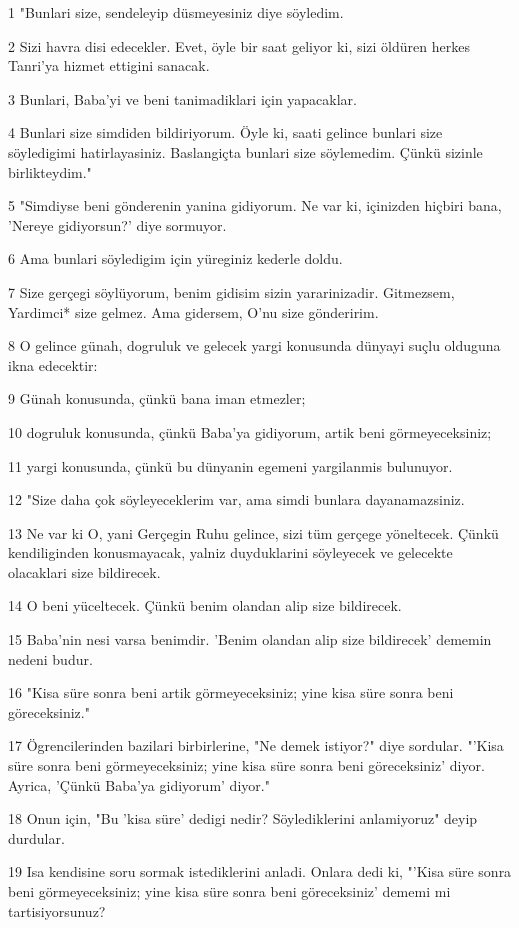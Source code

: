 \par 1 "Bunlari size, sendeleyip düsmeyesiniz diye söyledim.
\par 2 Sizi havra disi edecekler. Evet, öyle bir saat geliyor ki, sizi öldüren herkes Tanri'ya hizmet ettigini sanacak.
\par 3 Bunlari, Baba'yi ve beni tanimadiklari için yapacaklar.
\par 4 Bunlari size simdiden bildiriyorum. Öyle ki, saati gelince bunlari size söyledigimi hatirlayasiniz. Baslangiçta bunlari size söylemedim. Çünkü sizinle birlikteydim."
\par 5 "Simdiyse beni gönderenin yanina gidiyorum. Ne var ki, içinizden hiçbiri bana, 'Nereye gidiyorsun?' diye sormuyor.
\par 6 Ama bunlari söyledigim için yüreginiz kederle doldu.
\par 7 Size gerçegi söylüyorum, benim gidisim sizin yararinizadir. Gitmezsem, Yardimci* size gelmez. Ama gidersem, O'nu size gönderirim.
\par 8 O gelince günah, dogruluk ve gelecek yargi konusunda dünyayi suçlu olduguna ikna edecektir:
\par 9 Günah konusunda, çünkü bana iman etmezler;
\par 10 dogruluk konusunda, çünkü Baba'ya gidiyorum, artik beni görmeyeceksiniz;
\par 11 yargi konusunda, çünkü bu dünyanin egemeni yargilanmis bulunuyor.
\par 12 "Size daha çok söyleyeceklerim var, ama simdi bunlara dayanamazsiniz.
\par 13 Ne var ki O, yani Gerçegin Ruhu gelince, sizi tüm gerçege yöneltecek. Çünkü kendiliginden konusmayacak, yalniz duyduklarini söyleyecek ve gelecekte olacaklari size bildirecek.
\par 14 O beni yüceltecek. Çünkü benim olandan alip size bildirecek.
\par 15 Baba'nin nesi varsa benimdir. 'Benim olandan alip size bildirecek' dememin nedeni budur.
\par 16 "Kisa süre sonra beni artik görmeyeceksiniz; yine kisa süre sonra beni göreceksiniz."
\par 17 Ögrencilerinden bazilari birbirlerine, "Ne demek istiyor?" diye sordular. "'Kisa süre sonra beni görmeyeceksiniz; yine kisa süre sonra beni göreceksiniz' diyor. Ayrica, 'Çünkü Baba'ya gidiyorum' diyor."
\par 18 Onun için, "Bu 'kisa süre' dedigi nedir? Söylediklerini anlamiyoruz" deyip durdular.
\par 19 Isa kendisine soru sormak istediklerini anladi. Onlara dedi ki, "'Kisa süre sonra beni görmeyeceksiniz; yine kisa süre sonra beni göreceksiniz' dememi mi tartisiyorsunuz?
